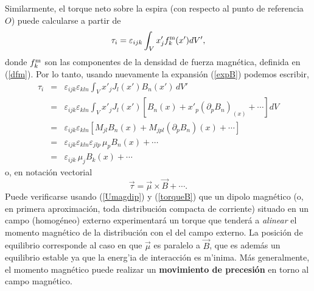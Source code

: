 Similarmente, el torque neto sobre la espira (con respecto al punto de referencia $O$)  puede calcularse a partir de
\begin{equation}
 \tau_i=\varepsilon_{ijk}\int_V x'_j f^{\rm m}_k(x') dV',
\end{equation}
donde $f^{\rm m}_k$ son las componentes de la densidad de fuerza magnética,
definida en (\ref{dfm}). Por lo tanto, usando nuevamente la expansión
(\ref{expB}) podemos escribir,
\begin{eqnarray}
  \tau_i&=&\varepsilon_{ijk}\varepsilon_{kln}\int_V x'_j J_l(x')B_n(x')\, dV' \\
&=&\varepsilon_{ijk}\varepsilon_{kln}\int_V x'_j
J_l(x')\left[B_n(x)+x'_p(\partial_pB_n)_(x) +\cdots\right] dV \\
&=&\varepsilon_{ijk}\varepsilon_{kln}\left[M_{jl}B_n(x)+M_{jpl}(\partial_pB_n)(x)
+\cdots\right] \\
&=&\varepsilon_{ijk}\varepsilon_{kln}\varepsilon_{jlp}\,\mu_pB_n(x)+\cdots\\
&=&\varepsilon_{ijk}\,\mu_jB_k(x)+\cdots 
\end{eqnarray}
o, en notación vectorial
\begin{equation}
 \boxed{\vec{\tau}=\vec{\mu}\times\vec{B}+\cdots .} \label{torqueB}
\end{equation}
Puede verificarse usando (\ref{Umagdip}) y (\ref{torqueB}) que un dipolo
magnético (o, en primera aproximación, toda distribución compacta de
corriente) situado en un campo (homogéneo) externo experimentará un torque
que tenderá a \textit{alinear} el momento magnético de la distribución con el
del campo externo. La posición de equilibrio corresponde al caso en que
$\vec{\mu}$ es paralelo a $\vec{B}$, que es además un equilibrio estable ya
que la energ'ia de interacción es m'inima. Más generalmente, el momento
magnético puede realizar un \textbf{movimiento de precesión} en torno al campo
magnético.


